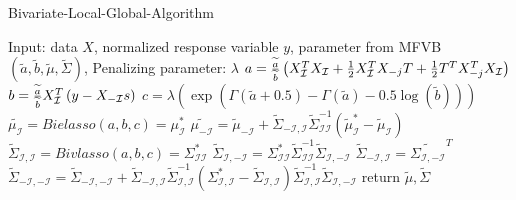 \newpage
\begin{algorithm}
	\caption{Bivariate-Local-Global-Algorithm}
	\begin{algorithmic}[1]
		
		\State Input: data $X$, normalized response variable $y$, parameter from MFVB $(\tilde{a},\tilde{b},\tilde{\mu},\tilde{\Sigma})$, Penalizing parameter: $\lambda$
		\State $a = \frac{\widetilde{a}}{\widetilde{b}} \left(X_{\mathcal I}^TX_{\mathcal I} + \tfrac{1}{2}X_{\mathcal I}^TX_{-j}T + \tfrac{1}{2}T^T X_{-j}^T X_{\mathcal I} \right)$ 
		\State $b = \frac{\widetilde{a}}{\widetilde{b}} X_{\mathcal I}^T\left( y - X_{-{\mathcal I}}s \right) $ 
		\State $c = \lambda (\exp(\Gamma(\tilde{a}+0.5) - \Gamma(\tilde{a}) - 0.5\log(\tilde{b})))  $ 
		\State $\tilde{\mu_{\mathcal{I}}} =  Bielasso(a,b,c) = \mu_\mathcal{I} ^*$ 
		\State $\tilde{\mu_{-\mathcal{I}}} = \tilde{\mu}_{-\mathcal{I}} +  \tilde{\Sigma}_{-\mathcal{I},\mathcal{I}}\tilde{\Sigma}^{-1}_{\mathcal{I}\mathcal{I}}(\tilde{\mu}_\mathcal{I}^*-\tilde{\mu}_\mathcal{I})$ 
		\State $\tilde{\Sigma}_{\mathcal{I},\mathcal{I}} = Bivlasso(a,b,c) = \Sigma_{\mathcal{I}\mathcal{I}}^*$ 
		\State $\tilde{\Sigma}_{\mathcal{I},-\mathcal{I}} = \Sigma_{\mathcal{I}\mathcal{I}}^*  \tilde{\Sigma}_{\mathcal{I}\mathcal{I}}^{-1}\tilde{\Sigma}_{\mathcal{I},-\mathcal{I}} $ 
		\State $\tilde{\Sigma}_{-\mathcal{I},\mathcal{I}} = \tilde{\Sigma_{\mathcal{I},-\mathcal{I}}}^T$ 
		\State $\tilde{\Sigma}_{-\mathcal{I},-\mathcal{I}} = \tilde{\Sigma}_{-\mathcal{I},-\mathcal{I}} + \tilde{\Sigma}_{-\mathcal{I},\mathcal{I}}\tilde{\Sigma}_{\mathcal{I},\mathcal{I}}^{-1}(\Sigma_{\mathcal{I},\mathcal{I}}^{*} - \tilde{\Sigma}_{\mathcal{I},\mathcal{I}})\tilde{\Sigma}_{\mathcal{I},\mathcal{I}}^{-1}\tilde{\Sigma}_{\mathcal{I},-\mathcal{I}}$ 		
		\EndFor
		\EndWhile
		\State return $\tilde{\mu},\tilde{\Sigma}$
	\end{algorithmic}
\end{algorithm}


